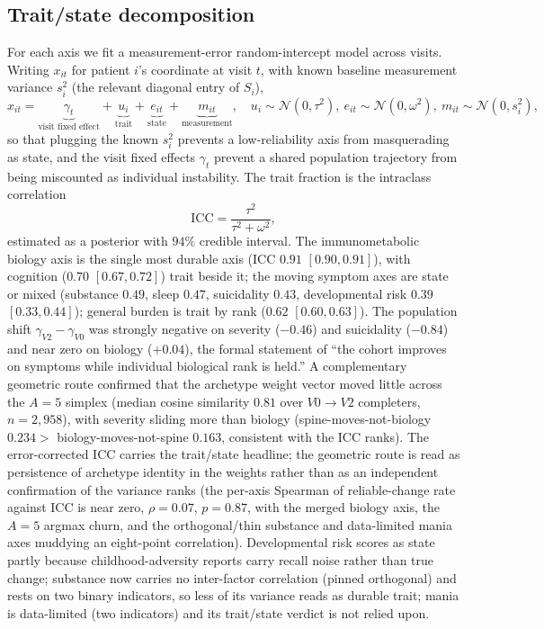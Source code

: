\subsection{Trait/state decomposition}

For each axis we fit a measurement-error random-intercept model across visits. Writing
$x_{it}$ for patient $i$'s coordinate at visit $t$, with known baseline measurement
variance $s_i^2$ (the relevant diagonal entry of $S_i$),
\begin{equation}
  x_{it}=\underbrace{\gamma_t}_{\text{visit fixed effect}}+\underbrace{u_i}_{\text{trait}}+\underbrace{e_{it}}_{\text{state}}+\underbrace{m_{it}}_{\text{measurement}},\quad
  u_i\sim\mathcal N(0,\tau^2),\ e_{it}\sim\mathcal N(0,\omega^2),\ m_{it}\sim\mathcal N(0,s_i^2),
  \label{eqC:traitstate}
\end{equation}
so that plugging the known $s_i^2$ prevents a low-reliability axis from masquerading as
state, and the visit fixed effects $\gamma_t$ prevent a shared population trajectory
from being miscounted as individual instability. The trait fraction is the
intraclass correlation
\begin{equation}
  \mathrm{ICC}=\frac{\tau^2}{\tau^2+\omega^2},
\end{equation}
estimated as a posterior with $94\%$ credible interval. The immunometabolic biology
axis is the single most durable axis (ICC $0.91$ $[0.90,0.91]$), with cognition
($0.70$ $[0.67,0.72]$) trait beside it; the moving symptom axes are state or mixed
(substance $0.49$, sleep $0.47$, suicidality $0.43$, developmental risk $0.39$
$[0.33,0.44]$); general burden is trait by rank ($0.62$ $[0.60,0.63]$). The population
shift $\gamma_{V2}-\gamma_{V0}$ was strongly negative on severity ($-0.46$) and
suicidality ($-0.84$) and near zero on biology ($+0.04$), the formal statement of
``the cohort improves on symptoms while individual biological rank is held.'' A
complementary geometric route confirmed that the archetype weight vector moved little
across the $A=5$ simplex (median cosine similarity $0.81$ over $V0\!\to\!V2$
completers, $n=2{,}958$), with severity sliding more than biology
(spine-moves-not-biology $0.234 >$ biology-moves-not-spine $0.163$, consistent with
the ICC ranks). The error-corrected ICC carries the trait/state headline; the
geometric route is read as persistence of archetype identity in the weights rather
than as an independent confirmation of the variance ranks (the per-axis Spearman of
reliable-change rate against ICC is near zero, $\rho=0.07$, $p=0.87$, with the merged
biology axis, the $A=5$ argmax churn, and the orthogonal/thin substance and data-limited
mania axes muddying an eight-point correlation). Developmental risk scores as state
partly because childhood-adversity reports carry recall noise rather than true change;
substance now carries no inter-factor correlation (pinned orthogonal) and rests on two
binary indicators, so less of its variance reads as durable trait; mania is data-limited
(two indicators) and its trait/state verdict is not relied upon.
